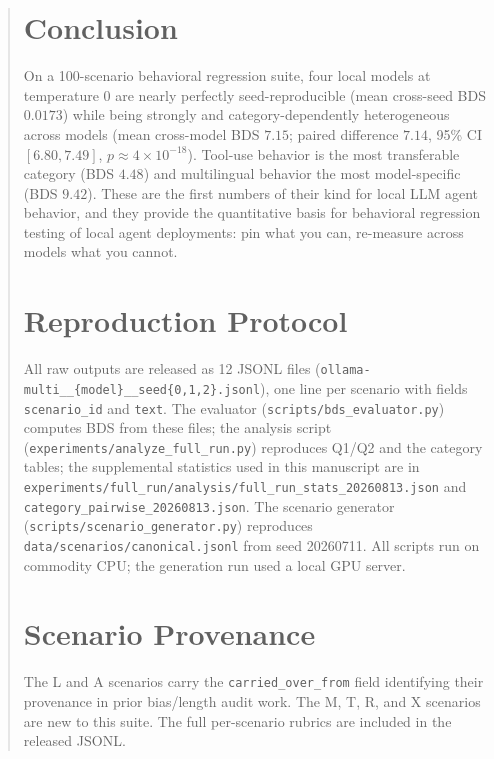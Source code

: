 \documentclass[11pt]{article}
\begin{document}
\begin{abstract}
\section{Conclusion}
\label{sec:conclusion}

On a 100-scenario behavioral regression suite, four local models at
temperature 0 are nearly perfectly seed-reproducible (mean cross-seed BDS
$0.0173$) while being strongly and category-dependently heterogeneous
across models (mean cross-model BDS $7.15$; paired difference $7.14$, 95\%
CI $[6.80, 7.49]$, $p \approx 4\times10^{-18}$). Tool-use behavior is the
most transferable category (BDS $4.48$) and multilingual behavior the most
model-specific (BDS $9.42$). These are the first numbers of their kind for
local LLM agent behavior, and they provide the quantitative basis for
behavioral regression testing of local agent deployments: pin what you
can, re-measure across models what you cannot.




\appendix
\section{Reproduction Protocol}
\label{app:repro}

All raw outputs are released as 12 JSONL files
(\texttt{ollama-multi\_\_\{model\}\_\_seed\{0,1,2\}.jsonl}), one line per
scenario with fields \texttt{scenario\_id} and \texttt{text}. The
evaluator (\texttt{scripts/bds\_evaluator.py}) computes BDS from these
files; the analysis script
(\texttt{experiments/analyze\_full\_run.py}) reproduces Q1/Q2 and the
category tables; the supplemental statistics used in this manuscript are
in
\texttt{experiments/full\_run/analysis/full\_run\_stats\_20260813.json} and
\texttt{category\_pairwise\_20260813.json}. The scenario generator
(\texttt{scripts/scenario\_generator.py}) reproduces
\texttt{data/scenarios/canonical.jsonl} from seed 20260711. All scripts run
on commodity CPU; the generation run used a local GPU server.

\section{Scenario Provenance}
\label{app:prov}

The \textsc{L} and \textsc{A} scenarios carry the
\texttt{carried\_over\_from} field identifying their provenance in prior
bias/length audit work. The \textsc{M}, \textsc{T}, \textsc{R}, and
\textsc{X} scenarios are new to this suite. The full per-scenario rubrics
are included in the released JSONL.



\end{abstract}
\end{document}
